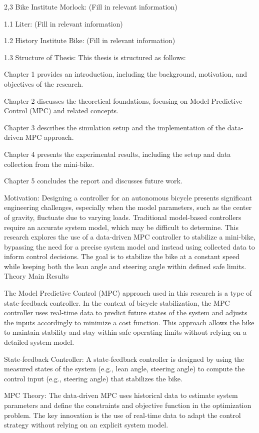     2,3 Bike Institute Morlock: (Fill in relevant information)

1.1 Liter: (Fill in relevant information)

1.2 History Institute Bike: (Fill in relevant information)

1.3 Structure of Thesis:
This thesis is structured as follows:

Chapter 1 provides an introduction, including the background, motivation, and objectives of the research.

Chapter 2 discusses the theoretical foundations, focusing on Model Predictive Control (MPC) and related concepts.

Chapter 3 describes the simulation setup and the implementation of the data-driven MPC approach.

Chapter 4 presents the experimental results, including the setup and data collection from the mini-bike.

Chapter 5 concludes the report and discusses future work.

Motivation:
Designing a controller for an autonomous bicycle presents significant engineering challenges, especially when the model parameters, such as the center of gravity, fluctuate due to varying loads. Traditional model-based controllers require an accurate system model, which may be difficult to determine. This research explores the use of a data-driven MPC controller to stabilize a mini-bike, bypassing the need for a precise system model and instead using collected data to inform control decisions. The goal is to stabilize the bike at a constant speed while keeping both the lean angle and steering angle within defined safe limits.
Theory
Main Results

The Model Predictive Control (MPC) approach used in this research is a type of state-feedback controller. In the context of bicycle stabilization, the MPC controller uses real-time data to predict future states of the system and adjusts the inputs accordingly to minimize a cost function. This approach allows the bike to maintain stability and stay within safe operating limits without relying on a detailed system model.

State-feedback Controller:
A state-feedback controller is designed by using the measured states of the system (e.g., lean angle, steering angle) to compute the control input (e.g., steering angle) that stabilizes the bike.

MPC Theory:
The data-driven MPC uses historical data to estimate system parameters and define the constraints and objective function in the optimization problem. The key innovation is the use of real-time data to adapt the control strategy without relying on an explicit system model.

